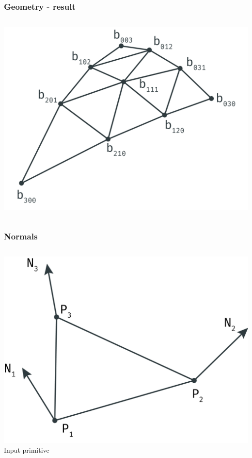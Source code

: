 	\begin{frame}\frametitle{Geometry - result}
		\begin{columns}
			\begin{column}{0.6\textwidth}
				\begin{center}
				\includegraphics[width=\textwidth]{img/1_single/geometry_4.png}
				\end{center}	
			\end{column}
		\end{columns}
	\end{frame}

		\begin{frame}\frametitle{Normals}
		\begin{columns}
			\begin{column}{0.6\textwidth}
				\begin{center}
					\includegraphics[width=\textwidth]{img/1_single/inputPrimitive.png}
					\small{Input primitive}
				\end{center}
			\end{column}
		\end{columns}
	\end{frame}

